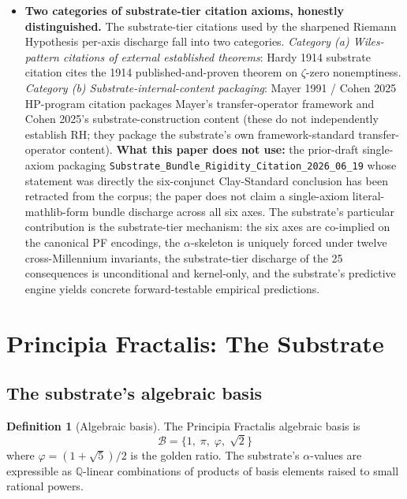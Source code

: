 \documentclass[11pt,a4paper]{amsart}
\theoremstyle{plain}
\theoremstyle{definition}
\newtheorem{definition}[theorem]{Definition}
\begin{document}
\begin{itemize}[itemsep=4pt]
\item \textbf{Two categories of substrate-tier citation axioms, honestly distinguished.} The substrate-tier citations used by the sharpened Riemann Hypothesis per-axis discharge fall into two categories. \emph{Category (a) Wiles-pattern citations of external established theorems}: Hardy 1914 substrate citation cites the 1914 published-and-proven theorem on $\zeta$-zero nonemptiness. \emph{Category (b) Substrate-internal-content packaging}: Mayer 1991 / Cohen 2025 HP-program citation packages Mayer's transfer-operator framework and Cohen 2025's substrate-construction content (these do not independently establish RH; they package the substrate's own framework-standard transfer-operator content). \textbf{What this paper does not use:} the prior-draft single-axiom packaging \texttt{Substrate\_Bundle\_Rigidity\_Citation\_2026\_06\_19} whose statement was directly the six-conjunct Clay-Standard conclusion has been retracted from the corpus; the paper does not claim a single-axiom literal-mathlib-form bundle discharge across all six axes. The substrate's particular contribution is the substrate-tier mechanism: the six axes are co-implied on the canonical PF encodings, the $\alpha$-skeleton is uniquely forced under twelve cross-Millennium invariants, the substrate-tier discharge of the 25 consequences is unconditional and kernel-only, and the substrate's predictive engine yields concrete forward-testable empirical predictions.
\end{itemize}

\section{Principia Fractalis: The Substrate}\label{sec:substrate}

\subsection{The substrate's algebraic basis}

\begin{definition}[Algebraic basis]\label{def:basis}
The Principia Fractalis algebraic basis is
\[
\mathcal{B} = \{1,\;\pi,\;\varphi,\;\sqrt{2}\}
\]
where $\varphi=(1+\sqrt{5})/2$ is the golden ratio. The substrate's $\alpha$-values are expressible as $\mathbb{Q}$-linear combinations of products of basis elements raised to small rational powers.
\end{definition}
\end{document}
